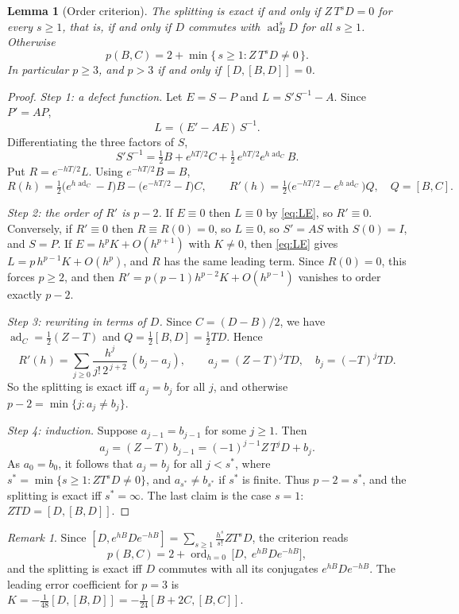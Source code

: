 \documentclass[11pt]{article}
\newtheorem{lemma}{Lemma}
\theoremstyle{remark}
\newtheorem{remark}{Remark}
\newcommand{\ad}{\operatorname{ad}}
\begin{document}
\begin{lemma}[Order criterion]\label{lem:crit}
The splitting is exact if and only if $Z\,T^{s}D=0$ for every $s\ge1$,
that is, if and only if $D$ commutes with $\ad_B^{s}D$ for all $s\ge 1$.
Otherwise
$$
p(B,C)=2+\min\{\,s\ge 1: Z\,T^{s}D\neq 0\,\}.
$$
In particular $p\ge 3$, and $p>3$ if and only if $[D,[B,D]]=0$.
\end{lemma}

\begin{proof}
\emph{Step 1: a defect function.}
Let $E=S-P$ and $L=S'S^{-1}-A$. Since $P'=AP$,
\begin{equation}\label{eq:LE}
L=(E'-AE)\,S^{-1}.
\end{equation}
Differentiating the three factors of $S$,
$$
S'S^{-1}=\tfrac12 B+e^{hT/2}C+\tfrac12\,e^{hT/2}e^{h\ad_C}B .
$$
Put $R=e^{-hT/2}L$. Using $e^{-hT/2}B=B$,
$$
R(h)=\tfrac12\bigl(e^{h\ad_C}-I\bigr)B-\bigl(e^{-hT/2}-I\bigr)C,
\qquad
R'(h)=\tfrac12\bigl(e^{-hT/2}-e^{h\ad_C}\bigr)Q,
\quad Q=[B,C].
$$

\emph{Step 2: the order of $R'$ is $p-2$.}
If $E\equiv0$ then $L\equiv0$ by \eqref{eq:LE}, so $R'\equiv0$.
Conversely, if $R'\equiv0$ then $R\equiv R(0)=0$, so $L\equiv0$, so
$S'=AS$ with $S(0)=I$, and $S=P$.
If $E=h^{p}K+O(h^{p+1})$ with $K\ne0$, then \eqref{eq:LE} gives
$L=p\,h^{p-1}K+O(h^{p})$, and $R$ has the same leading term. Since
$R(0)=0$, this forces $p\ge2$, and then
$R'=p(p-1)h^{p-2}K+O(h^{p-1})$ vanishes to order exactly $p-2$.

\emph{Step 3: rewriting in terms of $D$.}
Since $C=(D-B)/2$, we have $\ad_C=\tfrac12(Z-T)$ and
$Q=\tfrac12[B,D]=\tfrac12TD$. Hence
$$
R'(h)=\sum_{j\ge0}\frac{h^{j}}{j!\,2^{\,j+2}}\,(b_j-a_j),
\qquad
a_j=(Z-T)^{j}TD,\quad b_j=(-T)^{j}TD .
$$
So the splitting is exact iff $a_j=b_j$ for all $j$, and otherwise
$p-2=\min\{j:a_j\ne b_j\}$.

\emph{Step 4: induction.}
Suppose $a_{j-1}=b_{j-1}$ for some $j\ge1$. Then
$$
a_j=(Z-T)\,b_{j-1}=(-1)^{j-1}Z\,T^{j}D+b_j .
$$
As $a_0=b_0$, it follows that $a_j=b_j$ for all $j<s^*$, where
$s^*=\min\{s\ge1:ZT^{s}D\ne0\}$, and $a_{s^*}\ne b_{s^*}$ if $s^*$ is
finite. Thus $p-2=s^*$, and the splitting is exact iff $s^*=\infty$.
The last claim is the case $s=1$: $ZTD=[D,[B,D]]$.
\end{proof}

\begin{remark}
Since $[D,e^{hB}De^{-hB}]=\sum_{s\ge1}\frac{h^{s}}{s!}ZT^{s}D$, the
criterion reads
$$
p(B,C)=2+\operatorname{ord}_{h=0}\,\bigl[D,\;e^{hB}De^{-hB}\bigr],
$$
and the splitting is exact iff $D$ commutes with all its conjugates
$e^{hB}De^{-hB}$. The leading error coefficient for $p=3$ is
$K=-\tfrac1{48}[D,[B,D]]=-\tfrac1{24}[B+2C,[B,C]]$.
\end{remark}
\end{document}

